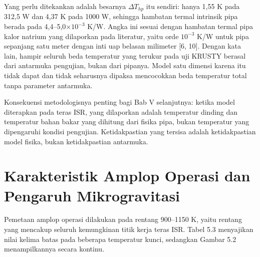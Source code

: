 \documentclass[
  indonesian,
  12pt,
  a4paper,
]{report}
\begin{document}
Yang perlu ditekankan adalah besarnya \(\Delta T_{hp}\) itu sendiri:
hanya 1,55 K pada 312,5 W dan 4,37 K pada 1000 W, sehingga hambatan
termal intrinsik pipa berada pada 4,4--5,0\(\times10^{-3}\) K/W. Angka
ini sesuai dengan hambatan termal pipa kalor natrium yang dilaporkan
pada literatur, yaitu orde \(10^{-3}\) K/W untuk pipa sepanjang satu
meter dengan inti uap belasan milimeter {[}6, 10{]}. Dengan kata lain,
hampir seluruh beda temperatur yang terukur pada uji KRUSTY berasal dari
antarmuka pengujian, bukan dari pipanya. Model satu dimensi karena itu
tidak dapat dan tidak seharusnya dipaksa mencocokkan beda temperatur
total tanpa parameter antarmuka.

Konsekuensi metodologisnya penting bagi Bab V selanjutnya: ketika model
diterapkan pada teras ISR, yang dilaporkan adalah temperatur dinding dan
temperatur bahan bakar yang dihitung dari fisika pipa, bukan temperatur
yang dipengaruhi kondisi pengujian. Ketidakpastian yang tersisa adalah
ketidakpastian model fisika, bukan ketidakpastian antarmuka.

\section{Karakteristik Amplop Operasi dan Pengaruh
Mikrogravitasi}\label{karakteristik-amplop-operasi-dan-pengaruh-mikrogravitasi}

Pemetaan amplop operasi dilakukan pada rentang 900--1150 K, yaitu
rentang yang mencakup seluruh kemungkinan titik kerja teras ISR. Tabel
5.3 menyajikan nilai kelima batas pada beberapa temperatur kunci,
sedangkan Gambar 5.2 menampilkannya secara kontinu.
\end{document}
